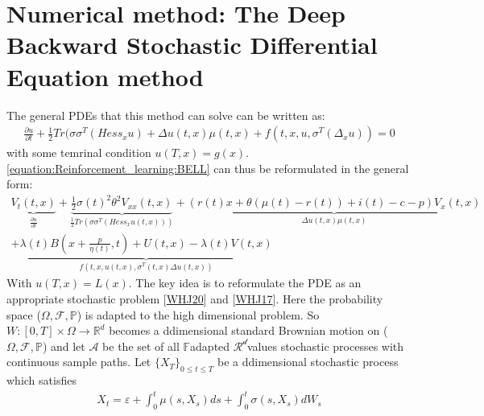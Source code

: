 \documentclass[letterpaper,10pt,english]{jupyterBook}
\begin{document}
\section{Numerical method: The Deep Backward Stochastic Differential Equation method}
\label{\detokenize{Financial_application:numerical-method-the-deep-backward-stochastic-differential-equation-method}}
\sphinxAtStartPar
The general PDEs that this method can solve can be written as:
\begin{equation}\label{equation:Financial_application:gen_form}
\begin{split}\frac{\partial u}{\partial t} + \frac{1}{2} Tr(\sigma \sigma^T (Hess_xu) + \Delta u(t,x)  \mu(t,x) + f(t,x,u, \sigma^T(\Delta_x u)) = 0 \end{split}
\end{equation}
\sphinxAtStartPar
with some temrinal condition \(u(T,x) = g(x)\). \eqref{equation:Reinforcement_learning:BELL} can thus be reformulated in the general form:
\begin{equation*}
\begin{split}\underbrace{V_t(t,x)}_{\frac{\partial u}{\partial t}} + \underbrace{\frac{1}{2}\sigma(t)^2\theta^2V_{xx}(t,x)}_{\frac{1}{2}Tr(\sigma \sigma^T(Hess_xu(t,x)))} + \underbrace{(r(t) x + \theta(\mu(t) -r(t)) + i(t) -c -p)V_x(t,x)}_{\Delta u(t,x)\mu (t,x)} \\ + \underbrace{\lambda(t)B(x+\frac{p}{\eta(t)},t) + U(t,x) - \lambda(t)V(t,x)}_{f(t,x,u(t,x), \sigma^T(t,x)\Delta u(t,x))}\end{split}
\end{equation*}
\sphinxAtStartPar
With \(u(T,x) = L(x)\). The key idea is to  reformulate the PDE as an appropriate stochastic problem {[}\hyperlink{cite.Discussion:id28}{WHJ20}{]} and {[}\hyperlink{cite.Discussion:id29}{WHJ17}{]}. Here the probability space (\(\Omega,\mathcal{F}, \mathbb{P}\)) is adapted to the high dimensional problem. So \(W: [0, T] \times \Omega \rightarrow \mathbb{R}^d\) becomes a d\sphinxhyphen{}dimensional standard Brownian motion on (\(\Omega,\mathcal{F}, \mathbb{P}\)) and let \(\mathcal{A}\) be the set of all \(\mathbb{F}\)\sphinxhyphen{}adapted \(\mathcal{R^d}\)\sphinxhyphen{}values stochastic processes with continuous sample paths. Let \(\{X_T\}_{0 \leq t \leq T}\) be a d\sphinxhyphen{}dimensional stochastic process which satisfies
\begin{equation*}
\begin{split} X_t = \varepsilon + \int_0^t \mu(s,X_s)ds + \int_0^t \sigma(s,X_s)dW_s \end{split}
\end{equation*}
\end{document}
